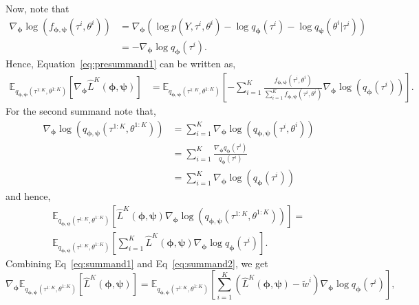 \documentclass{article}
\newcommand{\E}{\mathbb{E}}
\begin{document}
Now, note that
\begin{align*}
    \nabla_{\bm{\phi}} \log(f_{\bm{\phi}, \bm{\psi}}(\tau^i, \theta^i)) &= \nabla_{\bm{\phi}} (\log p(Y, \tau^i, \theta^i) - \log q_{\bm{\phi}}(\tau^i) - \log q_{\bm{\psi}}(\theta^i | \tau^i)) \\
    &= - \nabla_{\bm{\phi}} \log q_{\bm{\phi}}(\tau^i).
\end{align*}
Hence, Equation~\ref{eq:presummand1} can be written as,
\begin{align}\label{eq:summand1}
    \E_{q_{\bm{\phi}, \bm{\psi}}(\tau^{1:K}, \theta^{1:K})}[\nabla_{\bm{\phi}} \hat{L}^K(\bm{\phi}, \bm{\psi})] &= \E_{q_{\bm{\phi}, \bm{\psi}}(\tau^{1:K}, \theta^{1:K})}\left[- \sum_{i=1}^{K} \frac{f_{\bm{\phi}, \bm{\psi}}(\tau^i, \theta^i) }{\sum\limits_{i=1}^{K} f_{\bm{\phi}, \bm{\psi}}(\tau^i, \theta^i)} \nabla_{\bm{\phi}} \log(q_{\bm{\phi}}(\tau^i))\right].
\end{align}
For the second summand note that,
\begin{align*}
    \nabla_{\bm{\phi}} \log(q_{\bm{\phi}, \bm{\psi}}(\tau^{1:K}, \theta^{1:K})) &= \sum\limits_{i=1}^{K} \nabla_{\bm{\phi}} \log(q_{\bm{\phi},\bm{\psi}}(\tau^{i}, \theta^{i})) \\
    &= \sum\limits_{i=1}^{K} \frac{\nabla_{\bm{\phi}} q_{\bm{\phi}}(\tau^{i})}{q_{\bm{\phi}}(\tau^{i})} \\
    &= \sum\limits_{i=1}^{K} \nabla_{\bm{\phi}} \log(q_{\bm{\phi}}(\tau^{i}))
\end{align*}
and hence,
\begin{multline}\label{eq:summand2}
    \E_{q_{\bm{\phi}, \bm{\psi}}(\tau^{1:K}, \theta^{1:K})}[\hat{L}^K(\bm{\phi}, \bm{\psi}) \nabla_{\bm{\phi}} \log(q_{\bm{\phi}, \bm{\psi}}(\tau^{1:K}, \theta^{1:K}))] = \\
    \E_{q_{\bm{\phi}, \bm{\psi}}(\tau^{1:K},\theta^{1:K})}\left[\sum\limits_{i=1}^{K} \hat{L}^K(\bm{\phi}, \bm{\psi}) \nabla_{\bm{\phi}} \log q_{\bm{\phi}}(\tau^{i})\right].
\end{multline}
Combining Eq~\ref{eq:summand1} and Eq~\ref{eq:summand2}, we get
\begin{equation}\label{eq:naive-gradient}
    \nabla_{\bm{\phi}} \E_{q_{\bm{\phi}, \bm{\psi}}(\tau^{1:K},\theta^{1:K})}[\hat{L}^K(\bm{\phi}, \bm{\psi})] = \E_{q_{\bm{\phi}, \bm{\psi}}(\tau^{1:K},\theta^{1:K})}\left[\sum\limits_{i=1}^{K} (\hat{L}^K(\bm{\phi}, \bm{\psi}) - \tilde{w}^i) \nabla_{\bm{\phi}} \log q_{\bm{\phi}}(\tau^i) \right],
\end{equation}
\end{document}
